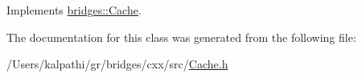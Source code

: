Implements \mbox{\hyperlink{classbridges_1_1_cache_ae74225542568a377fdcaf0354e466954}{bridges\+::\+Cache}}.



The documentation for this class was generated from the following file\+:\begin{DoxyCompactItemize}
\item 
/\+Users/kalpathi/gr/bridges/cxx/src/\mbox{\hyperlink{_cache_8h}{Cache.\+h}}\end{DoxyCompactItemize}
